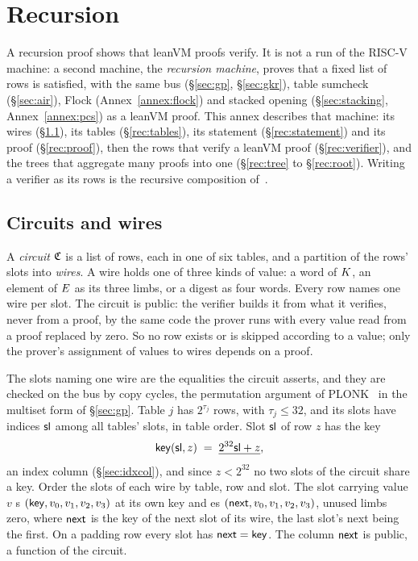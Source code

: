 \section{Recursion}\label{annex:rec}

A recursion proof shows that leanVM proofs verify. It is not a run of the RISC-V machine: a second machine, the \emph{recursion machine}, proves that a fixed list of rows is satisfied, with the same bus (\S\ref{sec:gp}, \S\ref{sec:gkr}), table sumcheck (\S\ref{sec:air}), Flock (Annex~\ref{annex:flock}) and stacked opening (\S\ref{sec:stacking}, Annex~\ref{annex:pcs}) as a leanVM proof. This annex describes that machine: its wires (\S\ref{rec:wires}), its tables (\S\ref{rec:tables}), its statement (\S\ref{rec:statement}) and its proof (\S\ref{rec:proof}), then the rows that verify a leanVM proof (\S\ref{rec:verifier}), and the trees that aggregate many proofs into one (\S\ref{rec:tree} to \S\ref{rec:root}). Writing a verifier as its rows is the recursive composition of~\cite{BCCT13}.

\subsection{Circuits and wires}\label{rec:wires}

A \emph{circuit} $\mathfrak{C}$ is a list of rows, each in one of six tables, and a partition of the rows' slots into \emph{wires}. A wire holds one of three kinds of value: a word of $K$, an element of $E$ as its three limbs, or a digest as four words. Every row names one wire per slot. The circuit is public: the verifier builds it from what it verifies, never from a proof, by the same code the prover runs with every value read from a proof replaced by zero. So no row exists or is skipped according to a value; only the prover's assignment of values to wires depends on a proof.

The slots naming one wire are the equalities the circuit asserts, and they are checked on the bus by copy cycles, the permutation argument of PLONK~\cite{GWC19} in the multiset form of \S\ref{sec:gp}. Table $j$ has $2^{\tau_j}$ rows, with $\tau_j\le32$, and its slots have indices $\mathsf{sl}$ among all tables' slots, in table order. Slot $\mathsf{sl}$ of row $z$ has the key
\[
  \mathsf{key}(\mathsf{sl},z)\;=\;\underline{2^{32}\mathsf{sl}+z},
\]
an index column (\S\ref{sec:idxcol}), and since $z<2^{32}$ no two slots of the circuit share a key. Order the slots of each wire by table, row and slot. The slot carrying value $v$ \pull{}s $( \mathsf{key},v_0,v_1,v_2,v_3 )$ at its own key and \push{}es $( \mathsf{next},v_0,v_1,v_2,v_3 )$, unused limbs zero, where $\mathsf{next}$ is the key of the next slot of its wire, the last slot's next being the first. On a padding row every slot has $\mathsf{next}=\mathsf{key}$. The column $\mathsf{next}$ is public, a function of the circuit.

